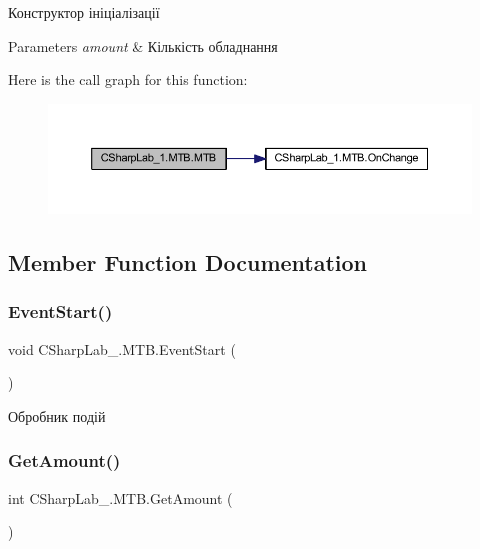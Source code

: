 Конструктор ініціалізації 


\begin{DoxyParams}{Parameters}
{\em amount} & Кількість обладнання\\
\hline
\end{DoxyParams}
Here is the call graph for this function\+:
\nopagebreak
\begin{figure}[H]
\begin{center}
\leavevmode
\includegraphics[width=350pt]{class_c_sharp_lab__1_1_1_m_t_b_a795c8d94ca1b20c77870728ae387d302_cgraph}
\end{center}
\end{figure}


\subsection{Member Function Documentation}
\hypertarget{class_c_sharp_lab__1_1_1_m_t_b_adabad767120ebeffbeba7beef05263ce}{}\label{class_c_sharp_lab__1_1_1_m_t_b_adabad767120ebeffbeba7beef05263ce} 
\subsubsection{\texorpdfstring{Event\+Start()}{EventStart()}}
{\footnotesize\ttfamily void C\+Sharp\+Lab\+\_.\+M\+T\+B.\+Event\+Start (\begin{DoxyParamCaption}{ }\end{DoxyParamCaption})}



Обробник подій 

\hypertarget{class_c_sharp_lab__1_1_1_m_t_b_a0a6eccaa6ad4e983c7f3fa47d6b926a9}{}\label{class_c_sharp_lab__1_1_1_m_t_b_a0a6eccaa6ad4e983c7f3fa47d6b926a9} 
\subsubsection{\texorpdfstring{Get\+Amount()}{GetAmount()}}
{\footnotesize\ttfamily int C\+Sharp\+Lab\+\_.\+M\+T\+B.\+Get\+Amount (\begin{DoxyParamCaption}{ }\end{DoxyParamCaption})}



